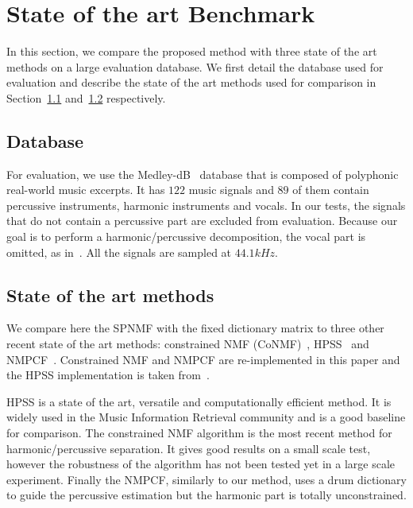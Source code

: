 \section{State of the art Benchmark}
\label{sec:stateoftheart}

In this section, we compare the proposed method with three state of the art methods on a large evaluation database. We first detail the database used for evaluation and describe the state of the art methods used for comparison in Section~\ref{database} and~\ref{soth} respectively.  


\subsection{Database}
\label{database}

For evaluation, we use the Medley-dB~\cite{bittner2014medleydb} database that is composed of polyphonic real-world music excerpts. It has $122$ music signals and $89$ of them contain percussive instruments, harmonic instruments and vocals. In our tests, the signals that do not contain a percussive part are excluded from evaluation. Because our goal is to perform a harmonic/percussive decomposition, the vocal part is omitted, as in~\cite{canadas2014percussive}. All the signals are sampled at $44.1kHz$.

\subsection{State of the art methods}
\label{soth}

We compare here the SPNMF with the fixed dictionary matrix to three other recent state of the art methods: constrained NMF (CoNMF)~\cite{canadas2014percussive}, HPSS~\cite{fitzgerald2010harmonic} and NMPCF~\cite{kim2011nonnegative}. Constrained NMF and NMPCF are re-implemented in this paper and the HPSS implementation is taken from~\cite{DriedgerMueller14_TSMToolbox_DAFX}.

HPSS is a state of the art, versatile and computationally efficient method. It is widely used in the Music Information Retrieval community and is a good baseline for comparison. The constrained NMF algorithm is the most recent method for harmonic/percussive separation. It gives good results on a small scale test, however the robustness of the algorithm has not been tested yet in a large scale experiment. Finally the NMPCF, similarly to our method, uses a drum dictionary to guide the percussive estimation but the harmonic part is totally unconstrained. 


